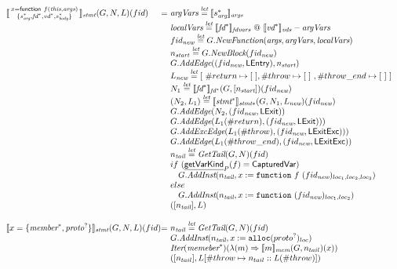 \[\begin{array}{l@{}l@{~}l}
\transfun{\irfunexprsmall{x}{f}{\emph{this}}{\emph{args}}{s_{\emph{arg}}^*}{\emph{fd}^*}{\emph{vd}^*}{s_{\emph{body}}^*}}_{\emph{stmt}}(G,N,L)(fid) & = &
	\argVars \letval \transfun{s_{\emph{arg}}^*}_{\emph{args}} \\
	& & \localVars \letval \transfun{\emph{fd}^*}_{\emph{fdvars}} ~@~ \transfun{\emph{vd}^*}_{\emph{vds}} - \argVars \\
	& & fid_{\emph{new}} \letval G.\emph{NewFunction}(\emph{args}, \argVars, \localVars)\\
	& & n_{\emph{start}} \letval G.\emph{NewBlock}(fid_{\emph{new}})\\
	& & G.\emph{AddEdge}((fid_{\emph{new}},\LEntry), n_{\emph{start}})\\
	& & L_{\emph{new}} \letval [\ \#return \mapsto [\ ], \#throw \mapsto [\ ]\ , \#throw\_end \mapsto [\ ]\ ] \\
	& & N_1 \letval \transfun{\emph{fd}^*}_{\emph{fd}^*}(G,[n_{\emph{start}}])(fid_{\emph{new}})\\
	& & (N_2,L_1) \letval \transfun{\emph{stmt}^*}_{\emph{stmt}*}(G,N_1,L_{\emph{new}})(fid_{\emph{new}})\\
	& & G.\emph{AddEdge}(N_2,(fid_{\emph{new}},\LExit))\\
	& & G.\emph{AddEdge}(L_1(\#return),(fid_{\emph{new}},\LExit)))\\
	& & G.\emph{AddExcEdge}(L_1(\#throw),(fid_{\emph{new}},\LExitExc)))\\
	& & G.\emph{AddEdge}(L_1(\#throw\_end),(fid_{\emph{new}},\LExitExc))\\
	& & n_{\emph{tail}} \letval \GetTail(G,N)(fid)\\
	& & if\ (\chf{getVarKind}_P(f) = \SF{CapturedVar}) \\
	& & \phantom{if} G.\emph{AddInst}(n_{\emph{tail}},x := \TT{function}\ f\ (fid_{\emph{new}})_{loc_1,loc_2,loc_3})\\
   & & else\ \\
	& & \phantom{if} G.\emph{AddInst}(n_{\emph{tail}},x := \TT{function}\ (fid_{\emph{new}})_{loc_1,loc_2})\\
	& & ([n_{\emph{tail}}],L)\\
	& & \\

\transfun{\irobject{x}{\emph{member}^*,\emph{proto}^{?}}}_{\emph{stmt}}(G,N,L)(fid) & = &
	n_{\emph{tail}} \letval \GetTail(G,N)(fid)\\
	& & G.\emph{AddInst}(n_{\emph{tail}},x := \TT{alloc}(proto^{?})_{loc})\\
	& & \Iter(\emph{memeber}^*)(\lambda(m)\Rightarrow \transfun{m}_{\emph{mem}}(G,n_{tail})(x))\\
	& & ([n_{tail}],L[\#throw \mapsto n_{tail}::L(\#throw)])\\
	& & \\


\end{array}\]
